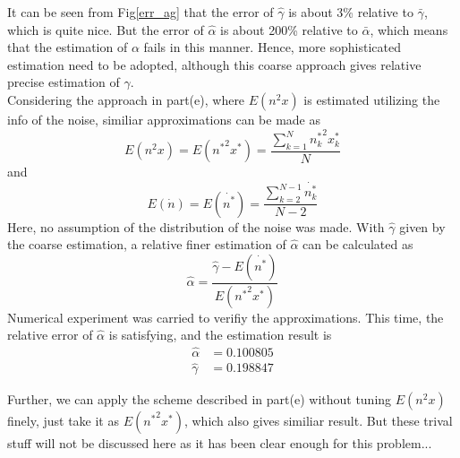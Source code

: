 \documentclass[paper=a4, fontsize=11pt]{scrartcl} %
\numberwithin{equation}{section} %
\numberwithin{figure}{section} %
\numberwithin{table}{section} %
\begin{document}
\begin{enumerate}[(a)]
			It can be seen from Fig\ref{err_ag} that the error of $\hat{\gamma}$ is about 3\% relative to $\bar{\gamma}$, which is quite nice. But the error of $\hat{\alpha}$ is about 200\% relative to $\bar{\alpha}$, which means that the estimation of $\alpha$ fails in this manner.
			Hence, more sophisticated estimation need to be adopted, although this coarse approach gives relative precise estimation of $\gamma$.\\
			Considering the approach in part(e), where $E(n^2 x)$ is estimated utilizing the info of the noise, similiar approximations can be made as
			\begin{equation}
				E(n^2 x) = E({n^*}^2 x^*) = \frac{\sum_{k=1}^{N}{n_k^*}^2 x_k^*}{N}
			\end{equation}
			and
			\begin{equation}
				E(\dot{n}) = E(\dot{n^*}) = \frac{\sum_{k=2}^{N-1}\dot{n_k^*}}{N-2}
			\end{equation}
			Here, no assumption of the distribution of the noise was made. With $\hat{\gamma}$ given by the coarse estimation, a relative finer estimation of $\hat{\alpha}$ can be calculated as
			\begin{equation}
				\hat{\alpha} = \frac{\hat{\gamma} - E(\dot{n^*})}{E({n^*}^2 x^*)}
			\end{equation} 
			Numerical experiment was carried to verifiy the approximations. This time, the relative error of $\hat{\alpha}$ is satisfying, and the estimation result is
			\begin{equation}
				\begin{aligned}
					\hat{\alpha} & = 0.100805\\
					\hat{\gamma} & = 0.198847
				\end{aligned}
			\end{equation}
			
			Further, we can apply the scheme described in part(e) without tuning  $E(n^2 x)$ finely, just take it as $E({n^*}^2 x^*)$, which also gives similiar result. But these trival stuff will not be discussed here as it has been clear enough for this problem...
	\end{enumerate}
\end{document}
